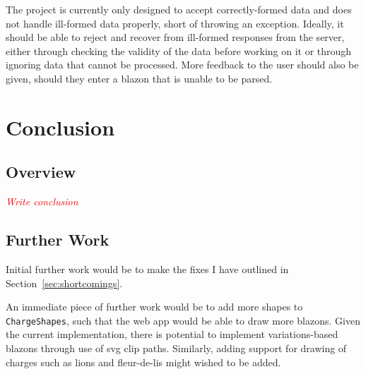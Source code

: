 \documentclass[nobib, a4paper, twoside, justified]{tufte-book}
\makeatletter
\newcommand{\svg}{\gls{svg}\@\xspace}
\newcommand{\charges}{\glspl{charge}\@\xspace}
\newcommand{\blazons}{\glspl{blazon}\@\xspace}
\newcommand{\todo}[1]{{\noindent\textcolor{Red}{\textit{\quad#1}}\par}}
\makeatother
\begin{document}
The project is currently only designed to accept correctly-formed data and does not handle
ill-formed data properly, short of throwing an exception. Ideally, it should be able to reject and
recover from ill-formed responses from the server, either through checking the validity of the data
before working on it or through ignoring data that cannot be processed. More feedback to the user
should also be given, should they enter a blazon that is unable to be parsed.

\chapter{Conclusion}%
\label{cha:conclusion}

\section{Overview}%
\label{sec:overview}

\todo{Write conclusion}

\section{Further Work}%
\label{sec:further_work}

Initial further work would be to make the fixes I have outlined in Section~\ref{sec:shortcomings}.

An immediate piece of further work would be to add more shapes to \texttt{ChargeShapes}, such that
the web app would be able to draw more \blazons. Given the current implementation, there is
potential to implement \glspl{variation}-based \blazons through use of \svg clip paths. Similarly,
adding support for drawing of \charges such as lions and fleur-de-lis might wished to be added.

\backmatter%

\printbibliography[heading=bibintoc]

\printglossary%


\end{document}

